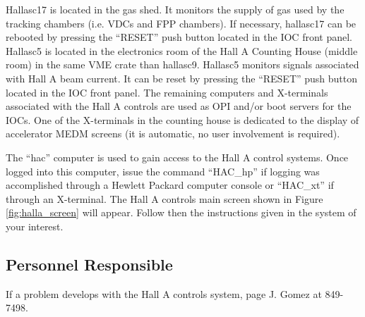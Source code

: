 Hallasc17 is located in the gas shed.
It monitors the supply of gas used by the tracking chambers (i.e. VDCs and FPP chambers).
If necessary, hallasc17 can be rebooted by pressing the ``RESET'' push button located in the IOC front panel.
Hallasc5 is located in the electronics room of the Hall A Counting House (middle room) in the same VME crate than hallasc9.
Hallasc5 monitors signals associated with Hall A beam current. It can be reset by pressing the ``RESET'' push button located in the
IOC front panel. The remaining computers and X-terminals associated with the Hall A controls are used as OPI and/or boot servers for the
IOCs. One of the X-terminals in the counting house is dedicated to the display of accelerator MEDM screens 
(it is automatic, no user involvement is required).

The ``hac'' computer is used to gain access to the Hall A control systems. Once logged into this computer, issue the command ``HAC\_hp''
if logging was accomplished through a Hewlett Packard computer console or ``HAC\_xt'' if through an X-terminal.
The Hall A controls main screen shown in Figure \ref{fig:halla_screen} will appear. Follow then the instructions given in the system of your interest.


\subsection{Personnel Responsible}
If a problem develops with the Hall A controls system, page J. Gomez at 849-7498. 


%
